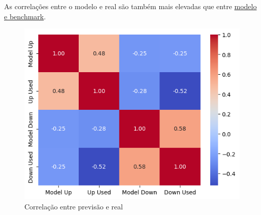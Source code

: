 As correlações entre o modelo e real são também mais elevadas que entre \hyperref[fig:featurecorrelation]{modelo e benchmark}.


\begin{figure}[H]
    \centering
    \includegraphics[width=\textwidth]{plots/heatmap_correlation_pred.png}
    \caption{Correlação entre previsão e real}
    \label{fig:predcorrelation}
  \end{figure}